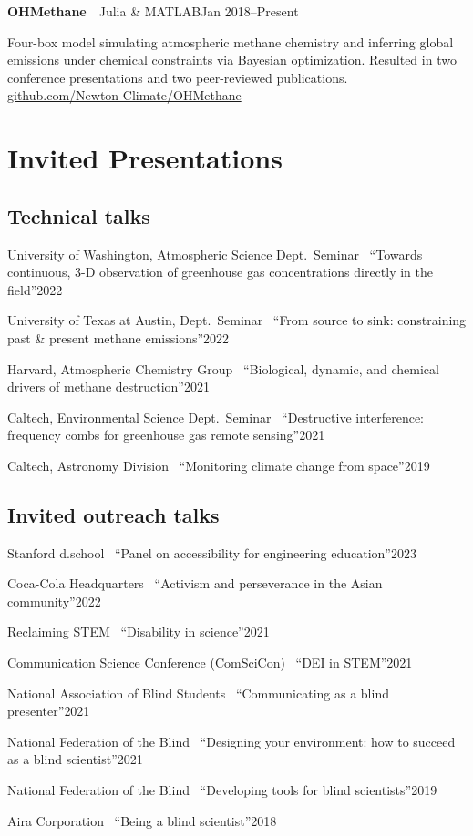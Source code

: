 \documentclass[11pt,letterpaper]{article}
\newcommand{\entry}[3]{\noindent\textbf{#1}~\textbar~#2\hfill{#3}\par}
\newcommand{\simpleentry}[2]{\noindent #1\hfill{#2}\par\vspace{1pt}}
\let\oldsection\section
\renewcommand{\section}[1]{\Needspace*{5\baselineskip}\oldsection{#1}}
\let\oldsubsection\subsection
\renewcommand{\subsection}[1]{\Needspace*{4\baselineskip}\oldsubsection{#1}}
\begin{document}
\entry{OHMethane}{Julia \& MATLAB}{Jan 2018--Present}
Four-box model simulating atmospheric methane chemistry and inferring global emissions under chemical
constraints via Bayesian optimization. Resulted in two conference presentations and two peer-reviewed
publications. \href{https://github.com/Newton-Climate/OHMethane}{github.com/Newton-Climate/OHMethane}

\section{Invited Presentations}

\subsection{Technical talks}
\simpleentry{University of Washington, Atmospheric Science Dept.\ Seminar \textbar\ ``Towards continuous, 3-D observation of greenhouse gas concentrations directly in the field''}{2022}
\simpleentry{University of Texas at Austin, Dept.\ Seminar \textbar\ ``From source to sink: constraining past \& present methane emissions''}{2022}
\simpleentry{Harvard, Atmospheric Chemistry Group \textbar\ ``Biological, dynamic, and chemical drivers of methane destruction''}{2021}
\simpleentry{Caltech, Environmental Science Dept.\ Seminar \textbar\ ``Destructive interference: frequency combs for greenhouse gas remote sensing''}{2021}
\simpleentry{Caltech, Astronomy Division \textbar\ ``Monitoring climate change from space''}{2019}

\subsection{Invited outreach talks}
\simpleentry{Stanford d.school \textbar\ ``Panel on accessibility for engineering education''}{2023}
\simpleentry{Coca-Cola Headquarters \textbar\ ``Activism and perseverance in the Asian community''}{2022}
\simpleentry{Reclaiming STEM \textbar\ ``Disability in science''}{2021}
\simpleentry{Communication Science Conference (ComSciCon) \textbar\ ``DEI in STEM''}{2021}
\simpleentry{National Association of Blind Students \textbar\ ``Communicating as a blind presenter''}{2021}
\simpleentry{National Federation of the Blind \textbar\ ``Designing your environment: how to succeed as a blind scientist''}{2021}
\simpleentry{National Federation of the Blind \textbar\ ``Developing tools for blind scientists''}{2019}
\simpleentry{Aira Corporation \textbar\ ``Being a blind scientist''}{2018}
\end{document}
